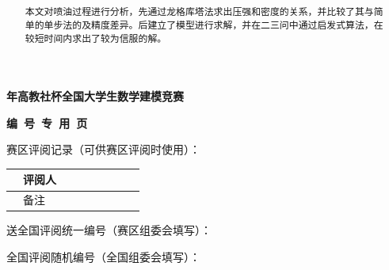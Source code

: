 \documentclass{article}
\newcounter{sub}
\begin{document}
	\newpage


	\begin{center}
		\textbf{\Year 年高教社杯全国大学生数学建模竞赛}

		\vspace{2em}

		\textbf{编~号~专~用~页}

		\vspace{2em}
	\end{center}

	{

		赛区评阅记录（可供赛区评阅时使用）：

		\begin{tabu}to
			\hline
			　评阅人　 &  &  &  &  &  &  \\ \hline
			　备注　 &  &  &  &  &  &  \\ \hline
		\end{tabu}

		\vspace{5em}

		送全国评阅统一编号（赛区组委会填写）：

		\vspace{10em}

		全国评阅随机编号（全国组委会填写）：
	}

	\vspace{5em}

	\textbf{}

	\restoregeometry
	\setcounter{page}{1}

\fi

\pagestyle{fancy}
\lhead{\small{\leftmark}}
\chead{\small{\rightmark}}
\lfoot{}
\cfoot{}
\rfoot{}


\title{\textbf{}}
\author{}
\date{}
\maketitle

\renewcommand{\abstractname}{\Large 摘要}
\begin{abstract}
	本文对喷油过程进行分析，先通过龙格库塔法求出压强和密度的关系，并比较了其与简单的单步法的及精度差异。后建立了模型进行求解，并在二三问中通过启发式算法，在较短时间内求出了较为信服的解。
\end{abstract}
\end{document}
